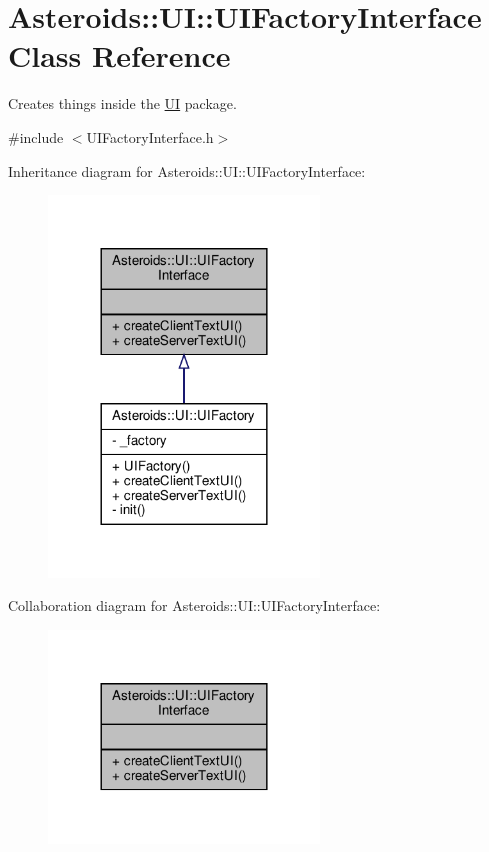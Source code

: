 \hypertarget{classAsteroids_1_1UI_1_1UIFactoryInterface}{}\section{Asteroids\+:\+:UI\+:\+:U\+I\+Factory\+Interface Class Reference}
\label{classAsteroids_1_1UI_1_1UIFactoryInterface}


Creates things inside the \hyperlink{namespaceAsteroids_1_1UI}{UI} package.  




{\ttfamily \#include $<$U\+I\+Factory\+Interface.\+h$>$}



Inheritance diagram for Asteroids\+:\+:UI\+:\+:U\+I\+Factory\+Interface\+:\nopagebreak
\begin{figure}[H]
\begin{center}
\leavevmode
\includegraphics[width=204pt]{classAsteroids_1_1UI_1_1UIFactoryInterface__inherit__graph}
\end{center}
\end{figure}


Collaboration diagram for Asteroids\+:\+:UI\+:\+:U\+I\+Factory\+Interface\+:\nopagebreak
\begin{figure}[H]
\begin{center}
\leavevmode
\includegraphics[width=204pt]{classAsteroids_1_1UI_1_1UIFactoryInterface__coll__graph}
\end{center}
\end{figure}
